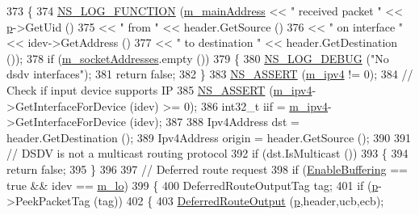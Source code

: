 \begin{DoxyCode}
373 \{
374   \hyperlink{log-macros-disabled_8h_a90b90d5bad1f39cb1b64923ea94c0761}{NS\_LOG\_FUNCTION} (\hyperlink{classns3_1_1dsdv_1_1RoutingProtocol_af7cb076b88eb5ff20a1c146e3f5849f6}{m\_mainAddress} << \textcolor{stringliteral}{" received packet "} << 
      \hyperlink{lte__link__budget_8m_ac9de518908a968428863f829398a4e62}{p}->GetUid ()
375                                  << \textcolor{stringliteral}{" from "} << header.GetSource ()
376                                  << \textcolor{stringliteral}{" on interface "} << idev->GetAddress ()
377                                  << \textcolor{stringliteral}{" to destination "} << header.GetDestination ());
378   \textcolor{keywordflow}{if} (\hyperlink{classns3_1_1dsdv_1_1RoutingProtocol_a9f3be507604655079b145f063cf036fd}{m\_socketAddresses}.empty ())
379     \{
380       \hyperlink{group__logging_ga413f1886406d49f59a6a0a89b77b4d0a}{NS\_LOG\_DEBUG} (\textcolor{stringliteral}{"No dsdv interfaces"});
381       \textcolor{keywordflow}{return} \textcolor{keyword}{false};
382     \}
383   \hyperlink{assert_8h_a6dccdb0de9b252f60088ce281c49d052}{NS\_ASSERT} (\hyperlink{classns3_1_1dsdv_1_1RoutingProtocol_a955477c7f38e64762a264c24e3762af6}{m\_ipv4} != 0);
384   \textcolor{comment}{// Check if input device supports IP}
385   \hyperlink{assert_8h_a6dccdb0de9b252f60088ce281c49d052}{NS\_ASSERT} (\hyperlink{classns3_1_1dsdv_1_1RoutingProtocol_a955477c7f38e64762a264c24e3762af6}{m\_ipv4}->GetInterfaceForDevice (idev) >= 0);
386   int32\_t iif = \hyperlink{classns3_1_1dsdv_1_1RoutingProtocol_a955477c7f38e64762a264c24e3762af6}{m\_ipv4}->GetInterfaceForDevice (idev);
387 
388   Ipv4Address dst = header.GetDestination ();
389   Ipv4Address origin = header.GetSource ();
390 
391   \textcolor{comment}{// DSDV is not a multicast routing protocol}
392   \textcolor{keywordflow}{if} (dst.IsMulticast ())
393     \{
394       \textcolor{keywordflow}{return} \textcolor{keyword}{false};
395     \}
396 
397   \textcolor{comment}{// Deferred route request}
398   \textcolor{keywordflow}{if} (\hyperlink{classns3_1_1dsdv_1_1RoutingProtocol_a257bf2eb6e7eff700d12f00f2d9ec0e3}{EnableBuffering} == \textcolor{keyword}{true} && idev == \hyperlink{classns3_1_1dsdv_1_1RoutingProtocol_a793deb930065a91d037ed2930e756528}{m\_lo})
399     \{
400       DeferredRouteOutputTag tag;
401       \textcolor{keywordflow}{if} (\hyperlink{lte__link__budget_8m_ac9de518908a968428863f829398a4e62}{p}->PeekPacketTag (tag))
402         \{
403           \hyperlink{classns3_1_1dsdv_1_1RoutingProtocol_a69ada1af49e7f09f91199062e14fb75f}{DeferredRouteOutput} (\hyperlink{lte__link__budget_8m_ac9de518908a968428863f829398a4e62}{p},header,ucb,ecb);

\end{DoxyCode}
